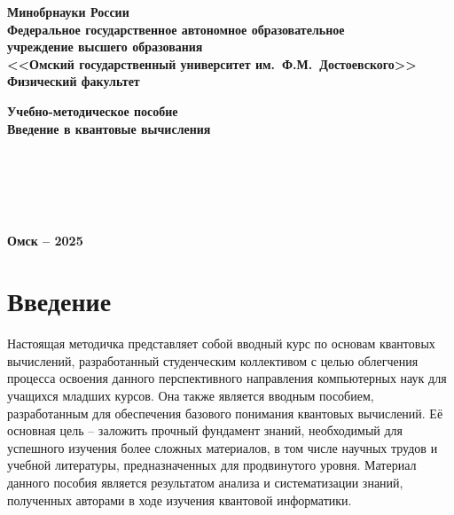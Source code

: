 \documentclass[12pt,a4paper]{article}
\begin{document}
	\begin{titlepage}
	\begin{center}
		{\large\bf {Минобрнауки России}\\[12pt]
			Федеральное государственное автономное образовательное \\
			учреждение высшего образования \\
			<<Омский государственный университет им.~Ф.М.~Достоевского>>\\[12pt]
			Физический факультет\\[12pt]
		}
		
		{\large\bf Учебно-методическое пособие}\\[12pt]
		{\Large\bf Введение в квантовые вычисления }\\[2cm]
	\end{center}
\vfill
	\hspace*{7cm}{\bf Составители:}\\[12pt]
	\hspace*{8cm}{\bf  Cтудент  Журавлева Анастасия }\\[12pt]
	\hspace*{8cm}{\bf  Cтудент Коцур Павел }\\[12pt]
	\hspace*{8cm}{\bf  Cтудент  Бахтин Артур}\\[1.5cm]	
		
	\begin{center}
		{\bf Омск -- 2025}
	\end{center}
\end{titlepage}

\addtocounter{page}{1}

\tableofcontents
	\newpage
 
	\section*{Введение}	
	Настоящая методичка представляет собой вводный курс по основам квантовых вычислений, разработанный студенческим коллективом с целью облегчения процесса освоения данного перспективного направления компьютерных наук для учащихся младших курсов. Она также является вводным пособием, разработанным для обеспечения базового понимания квантовых вычислений. Её основная цель – заложить прочный фундамент знаний, необходимый для успешного изучения более сложных материалов, в том числе научных трудов и учебной литературы, предназначенных для продвинутого уровня. Материал данного пособия является результатом анализа и систематизации знаний, полученных авторами в ходе изучения квантовой информатики.\\
	
\end{document}
